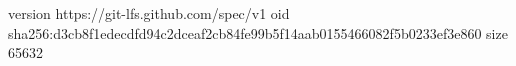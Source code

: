 version https://git-lfs.github.com/spec/v1
oid sha256:d3cb8f1edecdfd94c2dceaf2cb84fe99b5f14aab0155466082f5b0233ef3e860
size 65632
